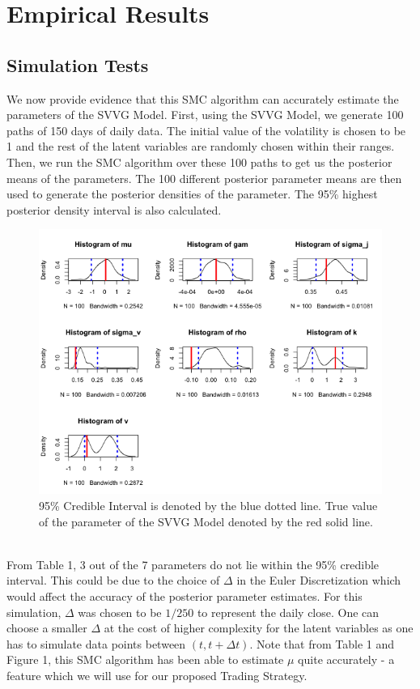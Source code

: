 \documentclass[12pt]{article}
\theoremstyle{definition}
\begin{document}
\section{Empirical Results}

\subsection{Simulation Tests}
We now provide evidence that this SMC algorithm can accurately estimate the parameters of the SVVG Model. First, using the SVVG Model, we generate 100 paths of 150 days of daily data. The initial value of the volatility is chosen to be 1 and the rest of the latent variables are randomly chosen within their ranges. Then, we run the SMC algorithm over these 100 paths to get us the posterior means of the parameters. The 100 different posterior parameter means are then used to generate the posterior densities of the parameter. The 95\% highest posterior density interval is also calculated.  \\
\begin{figure}
\includegraphics[width=\textwidth]{density_plots}
\caption{95\% Credible Interval is denoted by the blue dotted line. True value of the parameter of the SVVG Model denoted by the red solid line.}
\end{figure}
\\
From Table 1, 3 out of the 7 parameters do not lie within the 95\% credible interval. This could be due to the choice of $\Delta$ in the Euler Discretization which would affect the accuracy of the posterior parameter estimates. For this simulation, $\Delta$ was chosen to be $1/250$ to represent the daily close. One can choose a smaller $\Delta$ at the cost of higher complexity for the latent variables as one has to simulate data points between $(t,t+\Delta t)$. Note that from Table 1 and Figure 1, this SMC algorithm has been able to estimate $\mu$  quite accurately - a feature which we will use for our proposed Trading Strategy.
\end{document}
